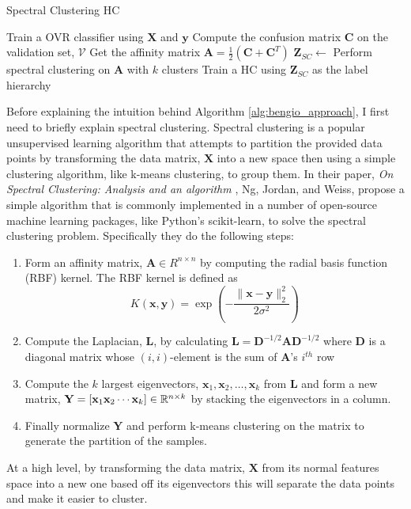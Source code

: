 \documentclass[../thesis.tex]{subfiles}
\begin{document}
\begin{algorithm}[H]
    \caption{Spectral Clustering HC}
    \label{alg:bengio_approach}
    \begin{algorithmic}[1]
            \State Train a OVR classifier using $\mathbf{X}$ and $\mathbf{y}$
            \State Compute the confusion matrix $\mathbf{C}$ on the validation set, $\mathcal{V}$
            \State Get the affinity matrix $\mathbf{A} = \frac{1}{2}\left(\mathbf{C} + \mathbf{C}^T\right)$
            \State $\mathbf{Z}_{SC} \gets $ Perform spectral clustering on $\mathbf{A}$ with $k$ clusters
            \State Train a HC using $\mathbf{Z}_{SC}$ as the label hierarchy
        \EndProcedure
    \end{algorithmic}
\end{algorithm}

Before explaining the intuition behind Algorithm \ref{alg:bengio_approach}, I first need to briefly explain spectral clustering. Spectral clustering is a popular unsupervised learning algorithm that attempts to partition the provided data points by transforming the data matrix, $\mathbf{X}$ into a new space then using a simple clustering algorithm, like k-means clustering, to group them. In their paper, \textit{On Spectral Clustering: Analysis and an algorithm} \cite{ng2002spectral}, Ng, Jordan, and Weiss, propose a simple algorithm that is commonly implemented in a number of open-source machine learning packages, like Python's scikit-learn, to solve the spectral clustering problem. Specifically they do the following steps:
\begin{enumerate}
    \item Form an affinity matrix, $\mathbf{A} \in R^{n \times n}$ by computing the radial basis function (RBF) kernel. The RBF kernel is defined as
    \begin{equation}
        \label{eq:rbf-kernel}
        K(\mathbf{x}, \mathbf{y}) = \exp\left(-\frac{\lVert \mathbf{x} - \mathbf{y}\rVert_2^2}{2\sigma^2}\right)
    \end{equation}
    \item Compute the Laplacian, $\mathbf{L}$, by calculating $\mathbf{L} = \mathbf{D}^{-1/2}\mathbf{A}\mathbf{D}^{-1/2}$ where $\mathbf{D}$ is a diagonal matrix whose $(i, i)$-element is the sum of $\mathbf{A}$'s $i^{th}$ row
    \item Compute the $k$ largest eigenvectors, $\mathbf{x}_1, \mathbf{x}_2, \ldots, \mathbf{x}_k$ from $\mathbf{L}$ and form a new matrix, $\mathbf{Y} = [\mathbf{x}_1 \mathbf{x}_2 \cdots \mathbf{x}_k] \in \mathbb{R}^{n \times k}$ by stacking the eigenvectors in a column. 
    \item Finally normalize $\mathbf{Y}$ and perform k-means clustering on the matrix to generate the partition of the samples. 
\end{enumerate}
At a high level, by transforming the data matrix, $\mathbf{X}$ from its normal features space into a new one based off its eigenvectors this will separate the data points and make it easier to cluster. 
\end{document}
